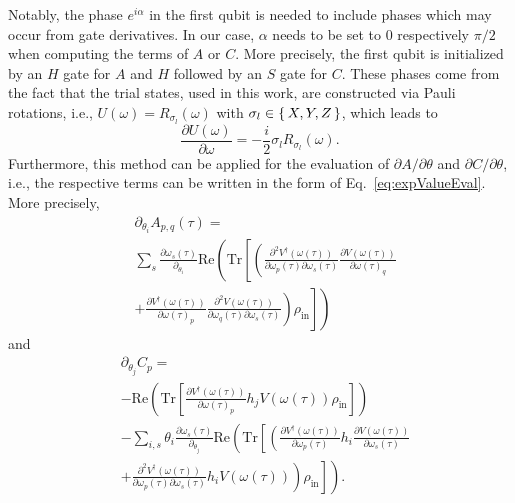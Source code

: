 \documentclass[twocolumn, aps, pra, superscriptaddress, floatfix]{revtex4}
\begin{document}
Notably, the phase $e^{i\alpha}$ in the first qubit is needed to include phases which may occur from gate derivatives. In our case, $\alpha$ needs to be set to $0$ respectively $\pi/2$ when computing the terms of $A$ or $C$. More precisely, the first qubit is initialized by an $H$ gate for $A$ and $H$ followed by an $S$ gate for $C$.
These phases come from the fact that the trial states, used in this work, are constructed via Pauli rotations, i.e., $U\left(\omega\right) = R_{\sigma_l}\left(\omega\right)$ with $\sigma_l \in \set{X, Y, Z}$, which leads to
\begin{equation}
 \frac{\partial U\left(\omega\right)}{\partial\omega}  = -\frac{i}{2}{\sigma_l}R_{\sigma_l}\left(\omega\right).
\end{equation}
Furthermore, this method can be applied for the evaluation of $\partial A / \partial \theta$ and $\partial C / \partial \theta$, i.e., the respective terms can be written in the form of Eq.~\eqref{eq:expValueEval}.
More precisely,
\begin{equation*}
\label{eq:dH_A}
\begin{split}
	&\partial_{\theta_i}A_{p,q}\left(\tau\right) =\\
&\sum\limits_s \frac{\partial\omega_s\left(\tau\right)}{\partial_{\theta_i}}\text{Re}\left(\text{Tr}\left[\left(\frac{\partial^2 V^{\dagger}\left({\omega\left(\tau\right)}\right)}{\partial\omega_p\left(\tau\right) \partial\omega_s\left(\tau\right)}\frac{\partial V\left({\omega\left(\tau\right)}\right)}{\partial\omega\left(\tau\right)_q}\right. \right.\right.\\
&\left.\left.\left. + \frac{\partial V^{\dagger}\left({\omega\left(\tau\right)}\right)}{\partial\omega\left(\tau\right)_p}\frac{\partial^2 V\left({\omega\left(\tau\right)}\right)}{\partial\omega_q\left(\tau\right)\partial\omega_s\left(\tau\right)}\right)\rho_{\text{in}}\right]\right)
\end{split}
\end{equation*}
and
\begin{equation*}
\label{eq:dH_C}
\begin{split}
	&\partial_{\theta_j}C_p = \\
	&-\text{Re}\left(\text{Tr}\left[\frac{\partial V^{\dagger}\left({\omega\left(\tau\right)}\right)}{\partial\omega\left(\tau\right)_p}h_jV\left({\omega\left(\tau\right)}\right)\rho_{\text{in}}\right]\right)\\
&\left. - \sum\limits_{i,s}\theta_i\frac{\partial\omega_s\left(\tau\right)}{\partial_{\theta_j}}\text{Re}\left( \text{Tr}\left[\left(\frac{\partial V^{\dagger}\left({\omega\left(\tau\right)}\right)}{\partial\omega_p\left(\tau\right)}h_i\frac{\partial V\left({\omega\left(\tau\right)}\right)}{\partial\omega_s\left(\tau\right)} \right.\right. \right.\right.\\
 &+ \left.\left. \left.\frac{\partial^2 V^{\dagger}\left({\omega\left(\tau\right)}\right)}{\partial\omega_p\left(\tau\right)\partial\omega_s\left(\tau\right)} h_iV\left({\omega\left(\tau\right)}\right)\right)\rho_{\text{in}} \right] \right).
	\end{split}
\end{equation*}
\end{document}
